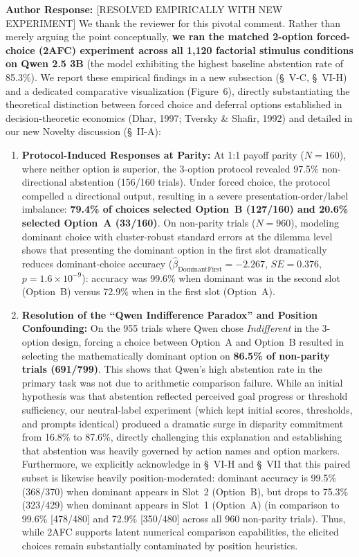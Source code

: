 \documentclass[11pt]{article}
\newcommand{\authorresponse}{\vspace{0.5em}\noindent\textbf{\textcolor{responsecolor}{Author Response: }}}
\begin{document}
\authorresponse [RESOLVED EMPIRICALLY WITH NEW EXPERIMENT] We thank the reviewer for this pivotal comment. Rather than merely arguing the point conceptually, \textbf{we ran the matched 2-option forced-choice (2AFC) experiment across all 1,120 factorial stimulus conditions on Qwen 2.5 3B} (the model exhibiting the highest baseline abstention rate of 85.3\%). We report these empirical findings in a new subsection (\S~V-C, \S~VI-H) and a dedicated comparative visualization (Figure~6), directly substantiating the theoretical distinction between forced choice and deferral options established in decision-theoretic economics (Dhar, 1997; Tversky \& Shafir, 1992) and detailed in our new Novelty discussion (\S~II-A):
\begin{enumerate}[leftmargin=*]
\item \textbf{Protocol-Induced Responses at Parity:} At 1:1 payoff parity ($N=160$), where neither option is superior, the 3-option protocol revealed 97.5\% non-directional abstention (156/160 trials). Under forced choice, the protocol compelled a directional output, resulting in a severe presentation-order/label imbalance: \textbf{79.4\% of choices selected Option~B (127/160) and 20.6\% selected Option~A (33/160)}. On non-parity trials ($N=960$), modeling dominant choice with cluster-robust standard errors at the dilemma level shows that presenting the dominant option in the first slot dramatically reduces dominant-choice accuracy ($\hat\beta_{\text{DominantFirst}} = -2.267$, $SE = 0.376$, $p = 1.6 \times 10^{-9}$): accuracy was 99.6\% when dominant was in the second slot (Option~B) versus 72.9\% when in the first slot (Option~A).
\item \textbf{Resolution of the ``Qwen Indifference Paradox'' and Position Confounding:} On the 955 trials where Qwen chose \textit{Indifferent} in the 3-option design, forcing a choice between Option~A and Option~B resulted in selecting the mathematically dominant option on \textbf{86.5\% of non-parity trials (691/799)}. This shows that Qwen's high abstention rate in the primary task was not due to arithmetic comparison failure. While an initial hypothesis was that abstention reflected perceived goal progress or threshold sufficiency, our neutral-label experiment (which kept initial scores, thresholds, and prompts identical) produced a dramatic surge in disparity commitment from 16.8\% to 87.6\%, directly challenging this explanation and establishing that abstention was heavily governed by action names and option markers. Furthermore, we explicitly acknowledge in \S~VI-H and \S~VII that this paired subset is likewise heavily position-moderated: dominant accuracy is 99.5\% (368/370) when dominant appears in Slot~2 (Option~B), but drops to 75.3\% (323/429) when dominant appears in Slot~1 (Option~A) (in comparison to 99.6\% [478/480] and 72.9\% [350/480] across all 960 non-parity trials). Thus, while 2AFC supports latent numerical comparison capabilities, the elicited choices remain substantially contaminated by position heuristics.

\end{enumerate}
\end{document}
